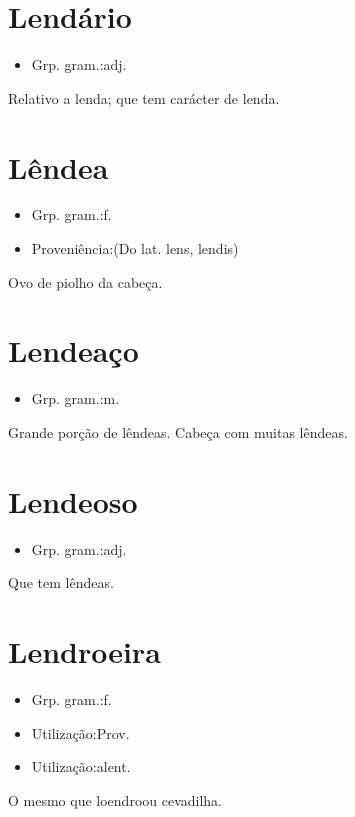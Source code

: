 \section{Lendário}
\begin{itemize}
\item {Grp. gram.:adj.}
\end{itemize}
Relativo a lenda; que tem carácter de lenda.
\section{Lêndea}
\begin{itemize}
\item {Grp. gram.:f.}
\end{itemize}
\begin{itemize}
\item {Proveniência:(Do lat. \textunderscore lens\textunderscore , \textunderscore lendis\textunderscore )}
\end{itemize}
Ovo de piolho da cabeça.
\section{Lendeaço}
\begin{itemize}
\item {Grp. gram.:m.}
\end{itemize}
Grande porção de lêndeas.
Cabeça com muitas lêndeas.
\section{Lendeoso}
\begin{itemize}
\item {Grp. gram.:adj.}
\end{itemize}
Que tem lêndeas.
\section{Lendroeira}
\begin{itemize}
\item {Grp. gram.:f.}
\end{itemize}
\begin{itemize}
\item {Utilização:Prov.}
\end{itemize}
\begin{itemize}
\item {Utilização:alent.}
\end{itemize}
O mesmo que \textunderscore loendro\textunderscore  ou \textunderscore cevadilha\textunderscore .
